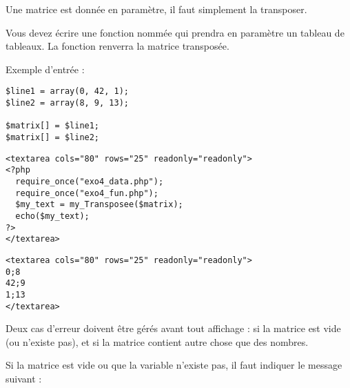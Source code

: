 

\vspace*{0.7cm}

\noindent {}

\bigskip

\noindent Une matrice est donnée en paramètre, il faut simplement la transposer.

\noindent Vous devez écrire une fonction nommée  qui prendra en paramètre un tableau de tableaux.
La fonction renverra la matrice transposée.

\bigskip

\noindent Exemple d'entrée :

\lstset{language=php}
\begin{lstlisting}[frame=single,title={Exemple de matrice (exo4\_data.php)}]
$line1 = array(0, 42, 1);
$line2 = array(8, 9, 13);

$matrix[] = $line1;
$matrix[] = $line2;
\end{lstlisting}

\lstset{language=html}
\begin{lstlisting}[frame=single,title={Appel de la fonction}]
<textarea cols="80" rows="25" readonly="readonly">
<?php
  require_once("exo4_data.php");
  require_once("exo4_fun.php");
  $my_text = my_Transposee($matrix);
  echo($my_text);
?>
</textarea>
\end{lstlisting}

\bigskip

\lstset{language=html}
\begin{lstlisting}[frame=single,title={Cas général}]
<textarea cols="80" rows="25" readonly="readonly">
0;8
42;9
1;13
</textarea>
\end{lstlisting}

\bigskip

\noindent Deux cas d'erreur doivent être gérés avant tout affichage : si la matrice est vide (ou n'existe pas), et si la matrice contient autre chose que des nombres.

\noindent Si la matrice est vide ou que la variable n'existe pas, il faut indiquer le message suivant :

\bigskip

